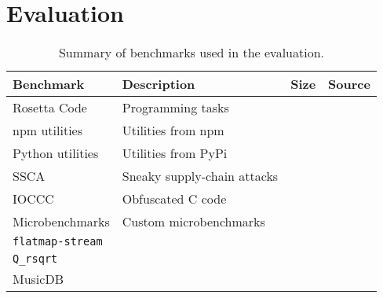 \documentclass[sigplan]{acmart}
\newcommand{\ttt}[1]{\texttt{#1}}
\begin{document}



\section{Evaluation}


\begin{table}[h]
\centering
\caption{Summary of benchmarks used in the evaluation.}
\begin{tabular}{llll}
\toprule
Benchmark                          & Description                 & Size & Source \\
\midrule
Rosetta Code                       & Programming tasks           &      & \\
npm utilities                      & Utilities from npm          &      & \\
Python utilities                   & Utilities from PyPi         &      & \\
SSCA                               & Sneaky supply-chain attacks &      & \\
IOCCC                              & Obfuscated C code           &      & \\
Microbenchmarks                    & Custom microbenchmarks      &      & \\
\hspace{.5em} \ttt{flatmap-stream} &                             &      & \\
\hspace{.5em} \ttt{Q_rsqrt}        &                             &      & \\
\hspace{.5em} \textsf{MusicDB}     &                             &      & \\
\bottomrule
\end{tabular}
\label{tab:benchmarks}
\end{table}



\end{document}
